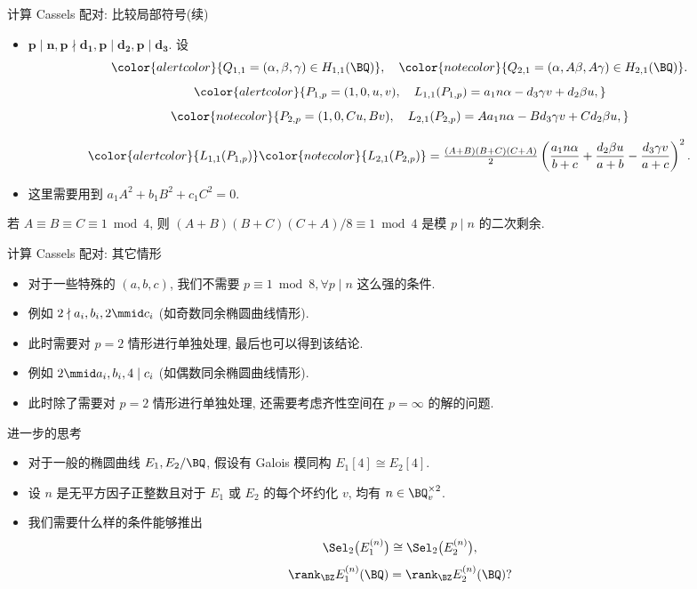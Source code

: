 \documentclass[12pt,handout]{ctexbeamer}
\newcommand\markatt[1]{{\color{alertcolor}{#1}}}
\newcommand\marknot[1]{{\color{notecolor}{#1}}}
\begin{document}
\begin{frame}{计算 Cassels 配对: 比较局部符号(续)}
\begin{itemize}
\item $\bm{p\mid n,p\nmid d_1,p\mid d_2,p\mid d_3}$.
\onslide<+-> 
设
\[\markatt{Q_{1,1}=(\alpha,\beta,\gamma)\in H_{1,1}(\BQ)},\quad
\marknot{Q_{2,1}=(\alpha,A\beta,A\gamma)\in H_{2,1}(\BQ)}.\]
\[\markatt{P_{1,p}=(1,0,u,v),\quad
L_{1,1}(P_{1,p})=a_1n\alpha-d_3\gamma v+d_2\beta u,}\]
\[\marknot{P_{2,p}=(1,0,Cu,Bv),\quad
L_{2,1}(P_{2,p})=Aa_1n\alpha-Bd_3\gamma v+Cd_2\beta u,}\]
\end{itemize}
\onslide<+-> 
\[\markatt{L_{1,1}(P_{1,p})}\marknot{L_{2,1}(P_{2,p})}=\tfrac{(A+B)(B+C)(C+A)}2\left(\frac{a_1n\alpha}{b+c}+\frac{d_2\beta u}{a+b}-\frac{d_3\gamma v}{a+c}\right)^2.\]
\begin{itemize}
\item 这里需要用到 $a_1A^2+b_1B^2+c_1C^2=0$.
\end{itemize}
\begin{lemma}
若 $A\equiv B\equiv C\equiv 1\bmod 4$, 则 $(A+B)(B+C)(C+A)/8\equiv 1\bmod 4$ 是模 $p\mid n$ 的二次剩余.
\end{lemma}
\end{frame}


\begin{frame}{计算 Cassels 配对: 其它情形}
\begin{itemize}
\item 对于一些特殊的 $(a,b,c)$, 我们不需要 $p\equiv 1\bmod 8,\forall p\mid n$ 这么强的条件.
\item 例如 $2\nmid a_i,b_i,2\mmid c_i$ (如奇数同余椭圆曲线情形).
\item 此时需要对 $p=2$ 情形进行单独处理, 最后也可以得到该结论.
\item 例如 $2\mmid a_i,b_i, 4\mid c_i$ (如偶数同余椭圆曲线情形).
\item 此时除了需要对 $p=2$ 情形进行单独处理, 还需要考虑齐性空间在 $p=\infty$ 的解的问题.
\end{itemize}
\end{frame}

\begin{frame}{进一步的思考}
\begin{itemize}
\item 对于一般的椭圆曲线 $E_1,E_2/\BQ$, 假设有 Galois 模同构 $E_1[4]\cong E_2[4]$.
\item 设 $n$ 是无平方因子正整数且对于 $E_1$ 或 $E_2$ 的每个坏约化 $v$, 均有 $n\in\BQ_v^{\times2}$.
\item 我们需要什么样的条件能够推出
\[\Sel_2\bigl(E_1^{(n)}\bigr)\cong\Sel_2\bigl(E_2^{(n)}\bigr),\]
\[\rank_\BZ E_1^{(n)}(\BQ)=\rank_\BZ E_2^{(n)}(\BQ)?\]
\end{itemize}
\end{frame}
\end{document}
